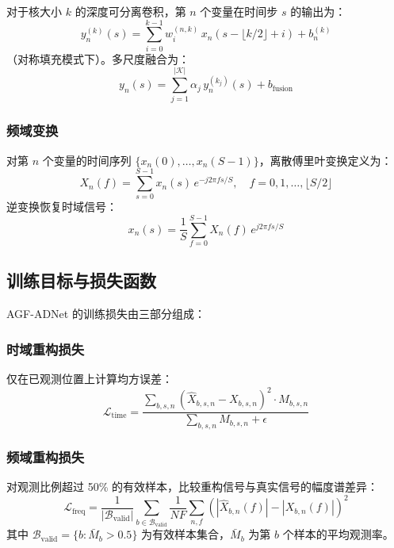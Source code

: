 \documentclass[UTF8]{ctexart}
\begin{document}
对于核大小 $k$ 的深度可分离卷积，第 $n$ 个变量在时间步 $s$ 的输出为：
\begin{equation}
    y_n^{(k)}(s) = \sum_{i=0}^{k-1} w_i^{(n,k)} \, x_n(s - \lfloor k/2 \rfloor + i) + b_n^{(k)}
\end{equation}
（对称填充模式下）。多尺度融合为：
\begin{equation}
    y_n(s) = \sum_{j=1}^{|\mathcal{K}|} \alpha_j \, y_n^{(k_j)}(s) + b_{\text{fusion}}
\end{equation}

\subsubsection{频域变换}

对第 $n$ 个变量的时间序列 $\{x_n(0), \ldots, x_n(S-1)\}$，离散傅里叶变换定义为：
\begin{equation}
    X_n(f) = \sum_{s=0}^{S-1} x_n(s) \, e^{-j 2\pi f s / S}, \quad f = 0, 1, \ldots, \lfloor S/2 \rfloor
\end{equation}
逆变换恢复时域信号：
\begin{equation}
    x_n(s) = \frac{1}{S} \sum_{f=0}^{S-1} X_n(f) \, e^{j 2\pi f s / S}
\end{equation}

\subsection{训练目标与损失函数}

AGF-ADNet 的训练损失由三部分组成：

\subsubsection{时域重构损失}

仅在已观测位置上计算均方误差：
\begin{equation}
    \mathcal{L}_{\text{time}} = \frac{\sum_{b,s,n} \left(\hat{X}_{b,s,n} - X_{b,s,n}\right)^2 \cdot M_{b,s,n}}{\sum_{b,s,n} M_{b,s,n} + \epsilon}
\end{equation}

\subsubsection{频域重构损失}

对观测比例超过 50\% 的有效样本，比较重构信号与真实信号的幅度谱差异：
\begin{equation}
    \mathcal{L}_{\text{freq}} = \frac{1}{|\mathcal{B}_{\text{valid}}|} \sum_{b \in \mathcal{B}_{\text{valid}}} \frac{1}{NF} \sum_{n,f} \left(|\hat{X}_{b,n}(f)| - |X_{b,n}(f)|\right)^2
\end{equation}
其中 $\mathcal{B}_{\text{valid}} = \{b : \bar{M}_b > 0.5\}$ 为有效样本集合，$\bar{M}_b$ 为第 $b$ 个样本的平均观测率。
\end{document}
